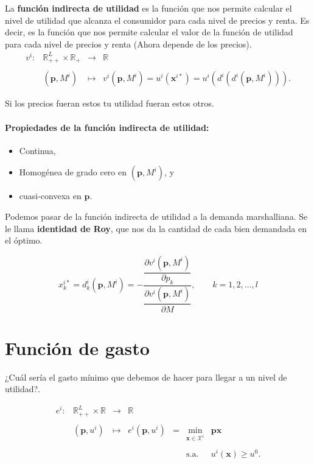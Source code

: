 La \textbf{función indirecta de utilidad} es la función que nos permite calcular el nivel de utilidad que alcanza el consumidor para cada nivel de precios y renta. Es decir, es la función que nos permite calcular el valor de la función de utilidad para cada nivel de precios y renta (Ahora depende de los precios). \\
$$
\begin{array}{rrcl}
    v^i: & \mathbb{R}_{++}^L \times \mathbb{R}_+ & \to &\mathbb{R}\\\\
	 & \left(\textbf{p},M^i\right) & \mapsto & v^i\left(\textbf{p},M^i\right) = u^i\left(\textbf{x}^{i*}\right)=u^i\left(d^i\left(d^i(\textbf{p},M^i)\right)\right).
\end{array}
$$

Si los precios fueran estos tu utilidad fueran estos otros. 

\paragraph{Propiedades de la función indirecta de utilidad:}

\begin{itemize}
    \item Continua,
    \item Homogénea de grado cero en $\left(\textbf{p},M^i\right)$, y
    \item cuasi-convexa en $\textbf{p}$.
\end{itemize}

Podemos pasar de la función indirecta de utilidad a la demanda marshalliana. Se le llama \textbf{identidad de Roy}, que nos da la cantidad de cada bien demandada en el óptimo.

$$x_k^{i*} = d_k^i\left(\textbf{p},M^i\right) = -\dfrac{\dfrac{\partial v^i\left(\textbf{p},M^i\right)}{\partial p_k}}{\dfrac{\partial v^i\left(\textbf{p},M^i\right)}{\partial M}}, \qquad k=1,2,\ldots, l$$


\section{Función de gasto}
¿Cuál sería el gasto mínimo que debemos de hacer para llegar a un nivel de utilidad?.

$$
\begin{array}{rrclcll}
    e^i: & \mathbb{R}_{++}^L \times \mathbb{R} & \to &\mathbb{R}&&&\\\\
	 & \left(\textbf{p},u^i\right) & \mapsto & e^i\left(\textbf{p},u^i\right) &=& \min_{\textbf{x} \in \mathcal{X}^i} & \textbf{px}\\\\
	 & & & &&\text{s.a. } & u^i(\textbf{x}) \geq u^0.
\end{array}
$$

